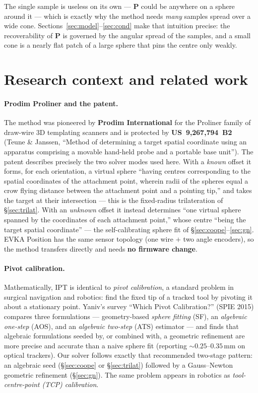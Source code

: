 \documentclass[11pt,a4paper]{article}
\newcommand{\bP}{\mathbf{P}}
\begin{document}
The single sample is useless on its own --- $\bP$ could be anywhere on a sphere
around it --- which is exactly why the method needs \emph{many} samples spread over
a wide cone. Sections~\ref{sec:model}--\ref{sec:cond} make that intuition precise:
the recoverability of $\bP$ is governed by the angular spread of the samples, and
a small cone is a nearly flat patch of a large sphere that pins the centre only
weakly.

\section{Research context and related work}
\label{sec:context}

\paragraph{Prodim Proliner and the patent.}
The method was pioneered by \textbf{Prodim International} for the Proliner family of
draw-wire 3D templating scanners and is protected by \textbf{US~9{,}267{,}794~B2}
(Teune \& Janssen, ``Method of determining a target spatial coordinate using an
apparatus comprising a movable hand-held probe and a portable base unit'').  The
patent describes precisely the two solver modes used here. With a \emph{known}
offset it forms, for each orientation, a virtual sphere ``having centres
corresponding to the spatial coordinates of the attachment point, wherein radii of
the spheres equal a crow flying distance between the attachment point and a pointing
tip,'' and takes the target at their intersection --- this is the fixed-radius
trilateration of \S\ref{sec:trilat}. With an \emph{unknown} offset it instead
determines ``one virtual sphere spanned by the coordinates of each attachment
point,'' whose centre ``being the target spatial coordinate'' --- the
self-calibrating sphere fit of \S\ref{sec:coope}--\ref{sec:gn}. EVKA Position has
the same sensor topology (one wire $+$ two angle encoders), so the method transfers
directly and needs \textbf{no firmware change}.

\paragraph{Pivot calibration.}
Mathematically, IPT is identical to \emph{pivot calibration}, a standard problem in
surgical navigation and robotics: find the fixed tip of a tracked tool by pivoting
it about a stationary point. Yaniv's survey ``Which Pivot Calibration?''
(SPIE 2015) compares three formulations --- geometry-based \emph{sphere fitting}
(SF), an \emph{algebraic one-step} (AOS), and an \emph{algebraic two-step} (ATS)
estimator --- and finds that algebraic formulations seeded by, or combined with, a
geometric refinement are more precise and accurate than a naive sphere fit
(reporting $\sim\!0.25$--$0.35$\,mm on optical trackers). Our solver follows exactly
that recommended two-stage pattern: an algebraic seed (\S\ref{sec:coope} or
\S\ref{sec:trilat}) followed by a Gauss--Newton geometric refinement
(\S\ref{sec:gn}). The same problem appears in robotics as \emph{tool-centre-point
(TCP) calibration}.
\end{document}
